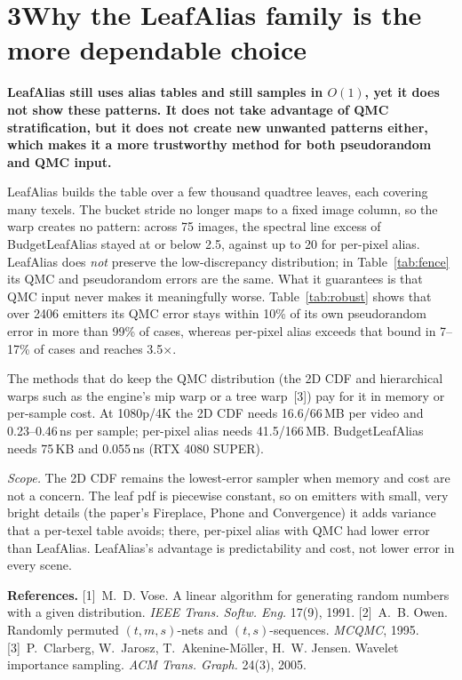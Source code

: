 \documentclass[10pt]{article}
\begin{document}
\section*{3\quad Why the LeafAlias family is the more dependable choice}

\textbf{LeafAlias still uses alias tables and still samples in $O(1)$, yet it does not show these patterns. It does not take advantage of QMC stratification, but it does not create new unwanted patterns either, which makes it a more trustworthy method for both pseudorandom and QMC input.}

LeafAlias builds the table over a few thousand quadtree leaves, each covering many texels. The bucket stride no longer maps to a fixed image column, so the warp creates no pattern: across 75 images, the spectral line excess of BudgetLeafAlias stayed at or below 2.5, against up to 20 for per-pixel alias. LeafAlias does \emph{not} preserve the low-discrepancy distribution; in Table~\ref{tab:fence} its QMC and pseudorandom errors are the same. What it guarantees is that QMC input never makes it meaningfully worse. Table~\ref{tab:robust} shows that over 2406 emitters its QMC error stays within 10\% of its own pseudorandom error in more than 99\% of cases, whereas per-pixel alias exceeds that bound in 7--17\% of cases and reaches 3.5$\times$.

The methods that do keep the QMC distribution (the 2D CDF and hierarchical warps such as the engine's mip warp or a tree warp~[3]) pay for it in memory or per-sample cost. At 1080p/4K the 2D CDF needs 16.6/66\,MB per video and 0.23--0.46\,ns per sample; per-pixel alias needs 41.5/166\,MB. BudgetLeafAlias needs 75\,KB and 0.055\,ns (RTX 4080 SUPER).

\emph{Scope.} The 2D CDF remains the lowest-error sampler when memory and cost are not a concern. The leaf pdf is piecewise constant, so on emitters with small, very bright details (the paper's Fireplace, Phone and Convergence) it adds variance that a per-texel table avoids; there, per-pixel alias with QMC had lower error than LeafAlias. LeafAlias's advantage is predictability and cost, not lower error in every scene.

\vspace{-0.3em}
{\footnotesize\noindent\textbf{References.} [1]~M.~D. Vose. A linear algorithm for generating random numbers with a given distribution. \emph{IEEE Trans. Softw. Eng.} 17(9), 1991. [2]~A.~B. Owen. Randomly permuted $(t,m,s)$-nets and $(t,s)$-sequences. \emph{MCQMC}, 1995. [3]~P.~Clarberg, W.~Jarosz, T.~Akenine-M\"oller, H.~W. Jensen. Wavelet importance sampling. \emph{ACM Trans. Graph.} 24(3), 2005.\par}
\end{document}
